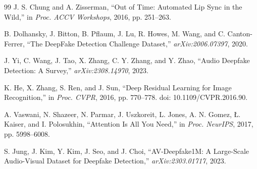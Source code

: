 \begin{thebibliography}{99}
J. S. Chung and A. Zisserman, ``Out of Time: Automated Lip Sync in the Wild,'' in \textit{Proc. ACCV Workshops}, 2016, pp. 251--263.

B. Dolhansky, J. Bitton, B. Pflaum, J. Lu, R. Howes, M. Wang, and C. Canton-Ferrer, ``The DeepFake Detection Challenge Dataset,'' \textit{arXiv:2006.07397}, 2020.

J. Yi, C. Wang, J. Tao, X. Zhang, C. Y. Zhang, and Y. Zhao, ``Audio Deepfake Detection: A Survey,'' \textit{arXiv:2308.14970}, 2023.

K. He, X. Zhang, S. Ren, and J. Sun, ``Deep Residual Learning for Image Recognition,'' in \textit{Proc. CVPR}, 2016, pp. 770--778. doi: 10.1109/CVPR.2016.90.

A. Vaswani, N. Shazeer, N. Parmar, J. Uszkoreit, L. Jones, A. N. Gomez, {\L}. Kaiser, and I. Polosukhin, ``Attention Is All You Need,'' in \textit{Proc. NeurIPS}, 2017, pp. 5998--6008.

S. Jung, J. Kim, Y. Kim, J. Seo, and J. Choi, ``AV-Deepfake1M: A Large-Scale Audio-Visual Dataset for Deepfake Detection,'' \textit{arXiv:2303.01717}, 2023.

\end{thebibliography}
